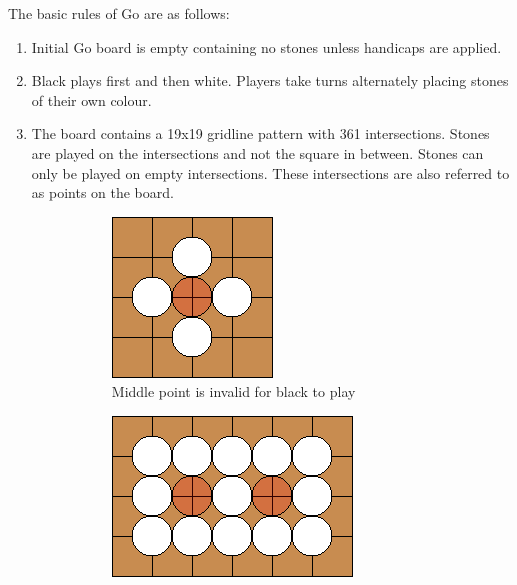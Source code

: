 \documentclass{l4proj}
\begin{document}
The basic rules of Go are as follows:
\begin{enumerate}

  \item Initial Go board is empty containing no stones unless handicaps are applied.
  \item Black plays first and then white. Players take turns alternately placing stones of their own colour.
  \item The board contains a 19x19 gridline pattern with 361 intersections. Stones are played on the intersections and not the square in between. Stones can only be played on empty intersections. These intersections are also referred to as points on the board.


  \begin{figure}[!ht]
  \centering
  \begin{subfigure}[t]{0.20\textwidth}
  \includegraphics[width=\textwidth]{ex/Ex2-0.png}
  \caption{Middle point is invalid for black to play}
  \label{fig:ex2-0}
  \end{subfigure}  \qquad\qquad\qquad
  \begin{subfigure}[t]{0.3\textwidth}
  \includegraphics[width=\textwidth]{ex/Ex2-1.png}

\end{subfigure}
\end{figure}
\end{enumerate}
\end{document}
